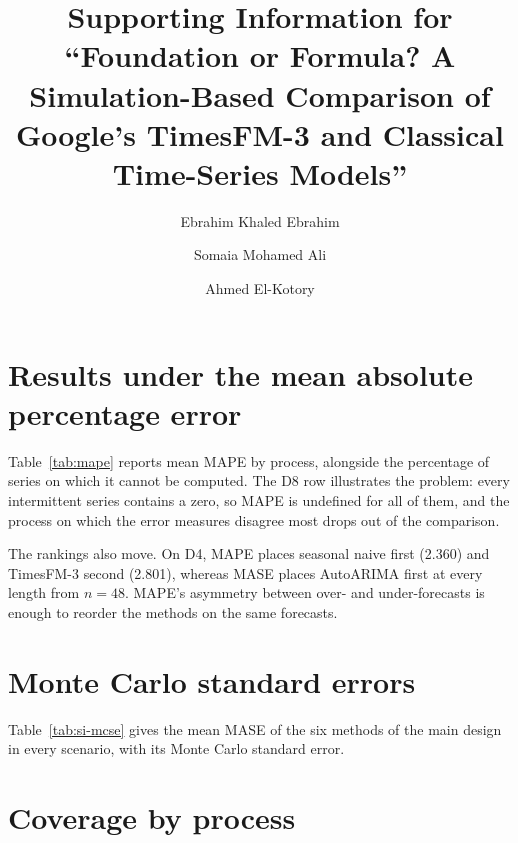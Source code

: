 \documentclass[ASNA]{USG}
\providecommand{\tableref}[1]{Table~\ref{#1}}
\begin{document}
\title{Supporting Information for ``Foundation or Formula? A Simulation-Based Comparison of
Google's TimesFM-3 and Classical Time-Series Models''}
\author[1]{Ebrahim Khaled Ebrahim}
\author[2]{Somaia Mohamed Ali}
\author[3]{Ahmed El-Kotory}
\address[1]{, }
\address[2]{, }
\address[3]{, }
\maketitle
\clearpage

\section{Results under the mean absolute percentage error}
\label{si:mape}

\tableref{tab:mape} reports mean MAPE by process, alongside the percentage of series on which
it cannot be computed. The D8 row illustrates the problem: every intermittent series contains a zero,
so MAPE is undefined for all of them, and the process on which the error measures disagree most drops out of the comparison.

The rankings also move. On D4, MAPE places seasonal naive first (2.360) and TimesFM-3 second
(2.801), whereas MASE places AutoARIMA first at every length from $n = 48$. MAPE's asymmetry
between over- and under-forecasts is enough to reorder the methods on the same forecasts.



\section{Monte Carlo standard errors}
\label{si:mcse}

\tableref{tab:si-mcse} gives the mean MASE of the six methods of the main design in every scenario,
with its Monte Carlo standard error.



\section{Coverage by process}
\label{si:coverage}
\end{document}
